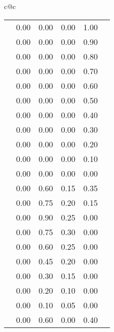%
%
%
%
\begin{footnotesize}
\begin{tabular}{c@{\quad}c}
  \begin{tabular}{|c|c|cccc|} \hline
\clspc
\clrow{black}                   & 0.00 & 0.00 & 0.00 & 1.00 \\
\clrow{verydeepgrey}            & 0.00 & 0.00 & 0.00 & 0.90 \\
\clrow{deepgrey}                & 0.00 & 0.00 & 0.00 & 0.80 \\
\clrow{verydarkgrey}            & 0.00 & 0.00 & 0.00 & 0.70 \\
\clrow{darkgrey}                & 0.00 & 0.00 & 0.00 & 0.60 \\
\clrow{grey}                    & 0.00 & 0.00 & 0.00 & 0.50 \\
\clrow{lightgrey}               & 0.00 & 0.00 & 0.00 & 0.40 \\
\clrow{verylightgrey}           & 0.00 & 0.00 & 0.00 & 0.30 \\
\clrow{palegrey}                & 0.00 & 0.00 & 0.00 & 0.20 \\
\clrow{verypalegrey}            & 0.00 & 0.00 & 0.00 & 0.10 \\
\clrow{white}                   & 0.00 & 0.00 & 0.00 & 0.00 \\
\clspc
\clrow{verydeeppink}            & 0.00 & 0.60 & 0.15 & 0.35 \\
\clrow{deeppink}                & 0.00 & 0.75 & 0.20 & 0.15 \\
\clrow{verydarkpink}            & 0.00 & 0.90 & 0.25 & 0.00 \\
\clrow{darkpink}                & 0.00 & 0.75 & 0.30 & 0.00 \\
\clrow{pink}                    & 0.00 & 0.60 & 0.25 & 0.00 \\
\clrow{lightpink}               & 0.00 & 0.45 & 0.20 & 0.00 \\
\clrow{verylightpink}           & 0.00 & 0.30 & 0.15 & 0.00 \\
\clrow{palepink}                & 0.00 & 0.20 & 0.10 & 0.00 \\
\clrow{verypalepink}            & 0.00 & 0.10 & 0.05 & 0.00 \\
\clspc
\clrow{verydeepmagenta}         & 0.00 & 0.60 & 0.00 & 0.40 \\

\end{tabular}
\end{tabular}
\end{footnotesize}
